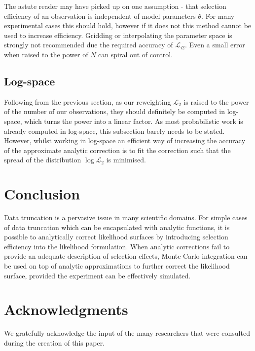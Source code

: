 \documentclass[a4paper,fleqn,usenatbib]{mnras}
\begin{document}
The astute reader may have picked up on one assumption - that selection efficiency of an observation is independent of model parameters $\theta$. For many experimental cases this should hold, however if it does not this method cannot be used to increase efficiency. Gridding or interpolating the parameter space is strongly not recommended due the required accuracy of $\mathcal{L}_{i2}$. Even a small error when raised to the power of $N$ can spiral out of control.

\subsection{Log-space}

Following from the previous section, as our reweighting $\mathcal{L}_2$ is raised to the power of the number of our observations, they should definitely be computed in log-space, which turns the power into a linear factor. As most probabilistic work is already computed in log-space, this subsection barely needs to be stated. However, whilst working in log-space an efficient way of increasing the accuracy of the approximate analytic correction is to fit the correction such that the spread of the distribution $\log\mathcal{L}_2$ is minimised. 














\section{Conclusion}
\label{sec:conclusion}


Data truncation is a pervasive issue in many scientific domains. For simple cases of data truncation which can be encapsulated with analytic functions, it is possible to analytically correct likelihood surfaces by introducing selection efficiency into the likelihood formulation. When analytic corrections fail to provide an adequate description of selection effects, Monte Carlo integration can be used on top of analytic approximations to further correct the likelihood surface, provided the experiment can be effectively simulated. 



\section*{Acknowledgments}

We gratefully acknowledge the input of the many researchers that were consulted during the creation of this paper.



\bsp	%
\label{lastpage}
\end{document}
